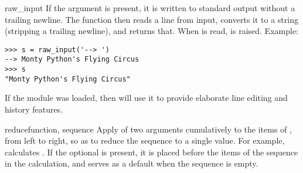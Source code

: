 \begin{funcdesc}{raw_input}{}
  If the  argument is present, it is written to standard output
  without a trailing newline.  The function then reads a line from input,
  converts it to a string (stripping a trailing newline), and returns that.
  When \EOF{} is read,  is raised. Example:

\begin{verbatim}
>>> s = raw_input('--> ')
--> Monty Python's Flying Circus
>>> s
"Monty Python's Flying Circus"
\end{verbatim}

  If the  module was loaded, then
   will use it to provide elaborate
  line editing and history features.
\end{funcdesc}

\begin{funcdesc}{reduce}{function, sequence}
  Apply  of two arguments cumulatively to the items of
  , from left to right, so as to reduce the sequence to
  a single value.  For example,
   calculates
  .
  If the optional  is present, it is placed before
  the items of the sequence in the calculation, and serves as a
  default when the sequence is empty.
\end{funcdesc}

